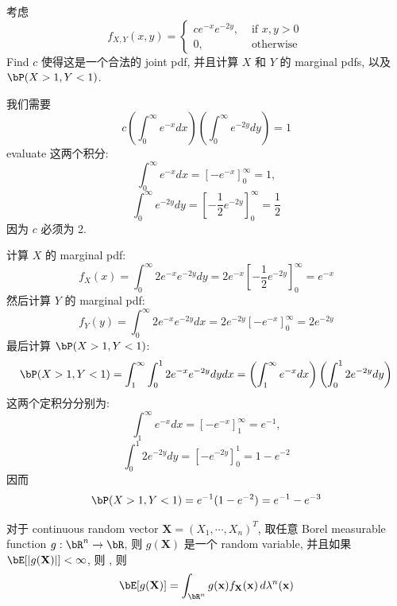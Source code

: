 \begin{example}
考虑 
\[
f_{X, Y}(x, y)= \begin{cases}c e^{-x} e^{-2 y}, & \text { if } x, y>0 \\ 0, & \text { otherwise }\end{cases}
\]
Find \(c\) 使得这是一个合法的 joint pdf, 
并且计算 \(X\) 和 \(Y\) 的 marginal pdfs, 以及 \(\bP(X>1, Y<1)\).
\begin{solution}
我们需要
$$c \left( \int_{0}^{\infty} e^{-x} dx \right) \left( \int_{0}^{\infty} e^{-2 y} dy \right) = 1$$
evaluate 这两个积分:
$$\int_{0}^{\infty} e^{-x} dx = \left[ -e^{-x} \right]_{0}^{\infty} = 1,$$
$$\int_{0}^{\infty} e^{-2 y} dy = \left[ -\frac{1}{2} e^{-2 y} \right]_{0}^{\infty} = \frac{1}{2}$$
因为 \(c\) 必须为 2.

计算 \(X\) 的 marginal pdf:
$$f_X(x) = \int_{0}^{\infty} 2 e^{-x} e^{-2 y} dy = 2 e^{-x} \left[ -\frac{1}{2} e^{-2 y} \right]_{0}^{\infty} = e^{-x}$$
然后计算 \(Y\) 的 marginal pdf:
$$f_Y(y) = \int_{0}^{\infty} 2 e^{-x} e^{-2 y} dx = 2 e^{-2 y} \left[ -e^{-x} \right]_{0}^{\infty} = 2 e^{-2 y}$$
最后计算 \(\bP(X>1, Y<1)\):
$$\bP(X > 1, Y < 1) = \int_{1}^{\infty} \int_{0}^{1} 2 e^{-x} e^{-2 y} dy dx = \left( \int_{1}^{\infty} e^{-x} dx \right) \left( \int_{0}^{1} 2 e^{-2 y} dy \right)$$
这两个定积分分别为:
$$\int_{1}^{\infty} e^{-x} dx = \left[ -e^{-x} \right]_{1}^{\infty} = e^{-1},$$
$$\int_{0}^{1} 2 e^{-2 y} dy = \left[ -e^{-2 y} \right]_{0}^{1} = 1 - e^{-2}$$ 
因而$$\bP(X > 1, Y < 1) = e^{-1} (1 - e^{-2}) = e^{-1} - e^{-3}$$
\end{solution}
\end{example}

\begin{theorem}
    对于 continuous random vector \(\mathbf{X} = (X_1, \cdots, X_n)^T\),
取任意 Borel measurable function \(g: \bR^n \to \bR\),
则 \(g(\mathbf{X})\) 是一个 random variable, 并且如果 \(\bE[|g(\mathbf{X})|] < \infty\), 则
, 则
$$\bE[g(\mathbf{X})] = \int_{\bR^n} g(\mathbf{x}) f_{\mathbf{X}}(\mathbf{x}) \, d\lambda^n(\mathbf{x})$$
\end{theorem}

